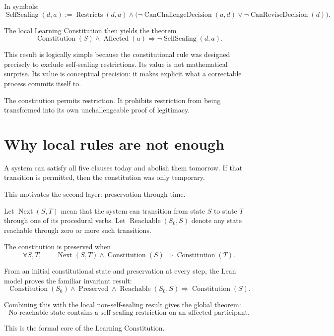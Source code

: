 \documentclass[11pt,a4paper]{article}
\begin{document}
In symbols:
\[
\operatorname{SelfSealing}(d,a)
:=
\operatorname{Restricts}(d,a)
\land
\bigl(
\neg\operatorname{CanChallengeDecision}(a,d)
\lor
\neg\operatorname{CanReviseDecision}(d)
\bigr).
\]

The local Learning Constitution then yields the theorem
\[
\boxed{
\operatorname{Constitution}(S)
\land
\operatorname{Affected}(a)
\Rightarrow
\neg\operatorname{SelfSealing}(d,a).
}
\]

This result is logically simple because the constitutional rule was designed precisely to exclude self-sealing restrictions. Its value is not mathematical surprise. Its value is conceptual precision: it makes explicit what a correctable process commits itself to.

The constitution permits restriction. It prohibits restriction from being transformed into its own unchallengeable proof of legitimacy.

\section{Why local rules are not enough}

A system can satisfy all five clauses today and abolish them tomorrow. If that transition is permitted, then the constitution was only temporary.

This motivates the second layer: preservation through time.

Let $\operatorname{Next}(S,T)$ mean that the system can transition from state $S$ to state $T$ through one of its procedural verbs. Let $\operatorname{Reachable}(S_0,S)$ denote any state reachable through zero or more such transitions.

The constitution is preserved when
\[
\forall S,T,
\qquad
\operatorname{Next}(S,T)
\land
\operatorname{Constitution}(S)
\Rightarrow
\operatorname{Constitution}(T).
\]

From an initial constitutional state and preservation at every step, the Lean model proves the familiar invariant result:
\[
\boxed{
\operatorname{Constitution}(S_0)
\land
\operatorname{Preserved}
\land
\operatorname{Reachable}(S_0,S)
\Rightarrow
\operatorname{Constitution}(S).
}
\]

Combining this with the local non-self-sealing result gives the global theorem:
\[
\boxed{
\text{No reachable state contains a self-sealing restriction on an affected participant.}
}
\]

This is the formal core of the Learning Constitution.
\end{document}
